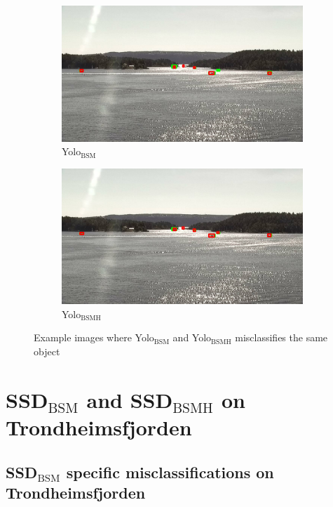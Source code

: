 \begin{figure}[h!]
\begin{subfigure}{.5\textwidth}
  \centering
  \includegraphics[width=0.9\linewidth]{results/case_buildings/yolo23/samemistake/yolo2/selected_08_11_frame3200.jpg}
  \caption{Yolo$_{\text{BSM}}$}
\end{subfigure}%
\begin{subfigure}{.5\textwidth}
  \centering
  \includegraphics[width=.9\linewidth]{results/case_buildings/yolo23/samemistake/yolo3/selected_08_11_frame3200.jpg}
  \caption{Yolo$_{\text{BSMH}}$}
\end{subfigure}
\caption{Example images where Yolo$_{\text{BSM}}$ and Yolo$_{\text{BSMH}}$ misclassifies the same object}
\label{img:yolo2_better}

\end{figure}

\newpage

\section{SSD$_{\text{BSM}}$ and SSD$_{\text{BSMH}}$ on Trondheimsfjorden}

\subsection{SSD$_{\text{BSM}}$ specific misclassifications on Trondheimsfjorden}
\label{sec:trf_ssd_bigbox}

